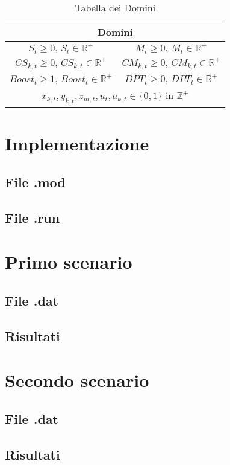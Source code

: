 \documentclass[12pt]{article}
\begin{document}
    \begin{table}[h] %
        \centering
        \begin{tabular}{|c|c|}
            \hline
            \multicolumn{2}{|c|}{\textbf{Domini}} \\
            \hline
            $S_t \geq 0, \, S_t \in \mathbb{R}^+$ & $M_t \geq 0, \, M_t \in \mathbb{R}^+$ \\
            \hline
            $CS_{k,t} \geq 0, \, CS_{k,t} \in \mathbb{R}^+$ & $CM_{k,t} \geq 0, \, CM_{k,t} \in \mathbb{R}^+$ \\
            \hline
            $Boost_t \geq 1, \, Boost_t \in \mathbb{R}^+$ &  $DPT_t \geq 0, \, DPT_t \in \mathbb{R}^+$ \\
            \hline
            \multicolumn{2}{|c|}{$x_{k,t}, y_{k,t}, z_{m,t}, u_t, a_{k,t} \in \{0,1\}$ in $\mathbb{Z}^+$} \\
            \hline
        \end{tabular}
        \caption{Tabella dei Domini}
        \label{tab:domini}
    \end{table}
    
    \newpage
    \section{Implementazione}
    \subsection{File .mod}
    \subsection{File .run}
    \section{Primo scenario}
    \subsection{File .dat}
    \subsection{Risultati}
    \section{Secondo scenario}
    \subsection{File .dat}
    \subsection{Risultati}
\end{document}
